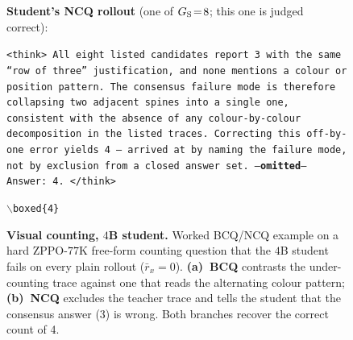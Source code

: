 \documentclass{llmxive}
\begin{document}
\begin{figure}[!p]
\begin{prompttemplatefig}
\textbf{Student's NCQ rollout} (one of $G_{\rm S}\!=\!8$; this one is judged correct):

\smallskip
\texttt{<think> All eight listed candidates report 3 with the same ``row of three'' justification, and none mentions a colour or position pattern. The consensus failure mode is therefore collapsing two adjacent spines into a single one, consistent with the absence of any colour-by-colour decomposition in the listed traces. Correcting this off-by-one error yields 4 -- arrived at by naming the failure mode, not by exclusion from a closed answer set. ---\textbf{omitted}--- Answer: 4. </think>}

\smallskip
\texttt{$\backslash$boxed\{4\}} \quad \checkmark
\end{prompttemplatefig}

\caption{\textbf{Visual counting, $4$B student.} Worked BCQ/NCQ example on a hard ZPPO-$77$K free-form counting question that the $4$B student fails on every plain rollout ($\bar{r}_x\!=\!0$). \textbf{(a)~BCQ} contrasts the under-counting trace against one that reads the alternating colour pattern; \textbf{(b)~NCQ} excludes the teacher trace and tells the student that the consensus answer (3) is wrong. Both branches recover the correct count of 4.}
\label{fig:appendix:bcq_ncq_books}
\end{figure}
\end{document}
